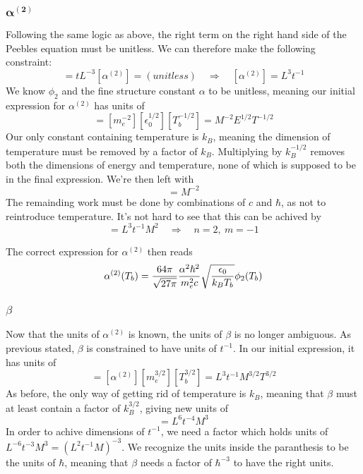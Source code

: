 \documentclass[10pt, a4paper]{article}
\begin{document}
\subsubsection{\texorpdfstring{$\mathbf{\alpha^{(2)}}$}{TEXT} }
Following the same logic as above, the right term on the right hand side of the Peebles equation must be unitless. We can therefore make the following constraint:
\begin{equation*}
    [H^{-1}][n_H][\alpha^{(2)}] = tL^{-3}[\alpha^{(2)}] = (unitless) \quad\Rightarrow\quad [\alpha^{(2)}] = L^3t^{-1}
\end{equation*}
We know $\phi_2$ and the fine structure constant $\alpha$ to be unitless, meaning our initial expression for $\alpha^{(2)}$ has units of
\begin{equation*}
    [\alpha^{(2)}] = [m_e^{-2}][\epsilon_0^{1/2}][T_b^{-1/2}] = M^{-2}E^{1/2}T^{-1/2}
\end{equation*}
Our only constant containing temperature is $k_B$, meaning the dimension of temperature must be removed by a factor of $k_B$. Multiplying by $k_B^{-1/2}$ removes both the dimensions of energy and temperature, none of which is supposed to be in the final expression. We're then left with
\begin{equation*}
    [\alpha^{(2)}][k_B^{1/2}] = M^{-2}
\end{equation*}
The remainding work must be done by combinations of $c$ and $\hbar$, as not to reintroduce temperature. It's not hard to see that this can be achived by
\begin{equation*}
    [\hbar^n][c^m] = L^3t^{-1}M^2  \quad\Rightarrow\quad n=2,\ m=-1
\end{equation*}

The correct expression for $\alpha^{(2)}$ then reads
\begin{equation*}
    \alpha^{(2)}\qty(T_{b}) =\frac{64 \pi}{\sqrt{27 \pi}} \frac{\alpha^{2} \hbar^2}{m_{e}^{2} c} \sqrt{\frac{\epsilon_{0}}{k_B T_{b}}} \phi_{2}\qty(T_{b})
\end{equation*}

\subsubsection{\texorpdfstring{\textbf{$\beta$}}{TEXT} }
Now that the units of $\alpha^{(2)}$ is known, the units of $\beta$ is no longer ambiguous. As previous stated, $\beta$ is constrained to have units of $t^{-1}$. In our initial expression, it has units of
\begin{equation*}
    [\beta] = [\alpha^{(2)}][m_e^{3/2}][T_b^{3/2}] = L^3t^{-1}M^{3/2}T^{3/2}
\end{equation*}
As before, the only way of getting rid of temperature is $k_B$, meaning that $\beta$ must at least contain a factor of $k_B^{3/2}$, giving new units of
\begin{equation*}
    [\beta][k_B^{3/2}] = L^6t^{-4}M^3
\end{equation*}
In order to achive dimensions of $t^{-1}$, we need a factor which holds units of $L^{-6}t^{-3}M^3 = (L^2t^{-1}M)^{-3}$. We recognize the units inside the paranthesis to be the units of $\hbar$, meaning that $\beta$ needs a factor of $\hbar^{-3}$ to have the right units.
\end{document}
